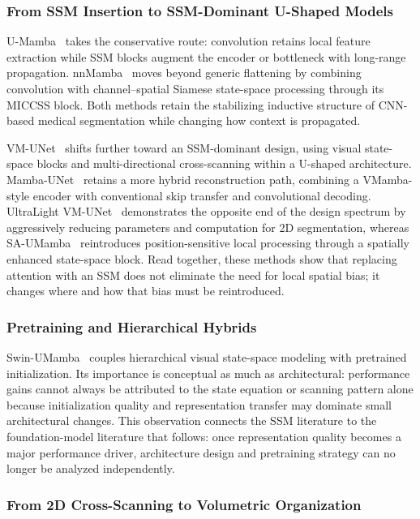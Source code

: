 \documentclass[5p,times,authoryear]{elsarticle}
\begin{document}
\subsubsection{From SSM Insertion to SSM-Dominant U-Shaped Models}

U-Mamba~\citep{ma2024umamba} takes the conservative route: convolution retains local feature extraction while SSM blocks augment the encoder or bottleneck with long-range propagation. nnMamba~\citep{gong2025nnmamba} moves beyond generic flattening by combining convolution with channel--spatial Siamese state-space processing through its MICCSS block. Both methods retain the stabilizing inductive structure of CNN-based medical segmentation while changing how context is propagated.

VM-UNet~\citep{ruan2024vm} shifts further toward an SSM-dominant design, using visual state-space blocks and multi-directional cross-scanning within a U-shaped architecture. Mamba-UNet~\citep{wang2024mamba} retains a more hybrid reconstruction path, combining a VMamba-style encoder with conventional skip transfer and convolutional decoding. UltraLight VM-UNet~\citep{wu2025ultralight} demonstrates the opposite end of the design spectrum by aggressively reducing parameters and computation for 2D segmentation, whereas SA-UMamba~\citep{liu2025sa} reintroduces position-sensitive local processing through a spatially enhanced state-space block. Read together, these methods show that replacing attention with an SSM does not eliminate the need for local spatial bias; it changes where and how that bias must be reintroduced.

\subsubsection{Pretraining and Hierarchical Hybrids}

Swin-UMamba~\citep{liu2024swin} couples hierarchical visual state-space modeling with pretrained initialization. Its importance is conceptual as much as architectural: performance gains cannot always be attributed to the state equation or scanning pattern alone because initialization quality and representation transfer may dominate small architectural changes. This observation connects the SSM literature to the foundation-model literature that follows: once representation quality becomes a major performance driver, architecture design and pretraining strategy can no longer be analyzed independently.

\subsubsection{From 2D Cross-Scanning to Volumetric Organization}
\end{document}
